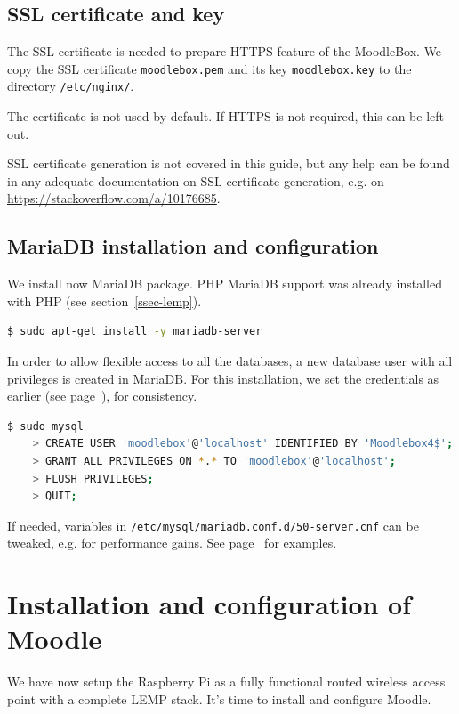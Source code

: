 \documentclass[12pt]{article}
\begin{document}
\subsection{SSL certificate and key}

The SSL certificate is needed to prepare HTTPS feature of the MoodleBox.
We copy the SSL certificate \lstinline{moodlebox.pem} and its key \lstinline{moodlebox.key} to the directory \lstinline{/etc/nginx/}.

The certificate is not used by default.
If HTTPS is not required, this can be left out.

SSL certificate generation is not covered in this guide, but any help can be
found in any adequate documentation on SSL certificate generation, e.g. on \url{https://stackoverflow.com/a/10176685}.

\subsection{MariaDB installation and configuration}\label{ssec-mariadb}

We install now MariaDB package.
PHP MariaDB support was already installed with PHP (see section~\ref{ssec-lemp}).
\begin{lstlisting}[language=bash]
$ sudo apt-get install -y mariadb-server
\end{lstlisting}

In order to allow flexible access to all the databases, a new database user with all privileges is created in MariaDB.
For this installation, we set the credentials as earlier (see page~\pageref{ssec-new-account}), for consistency.

\begin{lstlisting}[language=bash]
$ sudo mysql
    > CREATE USER 'moodlebox'@'localhost' IDENTIFIED BY 'Moodlebox4$';
    > GRANT ALL PRIVILEGES ON *.* TO 'moodlebox'@'localhost';
    > FLUSH PRIVILEGES;
    > QUIT;
\end{lstlisting}

If needed, variables in \lstinline{/etc/mysql/mariadb.conf.d/50-server.cnf} can be tweaked, e.g. for performance gains. See page~\pageref{ssec-mariadb-optimisation} for examples.

\section{Installation and configuration of Moodle}

We have now setup the Raspberry Pi as a fully functional routed wireless access point with a complete LEMP stack.
It's time to install and configure Moodle.
\end{document}
